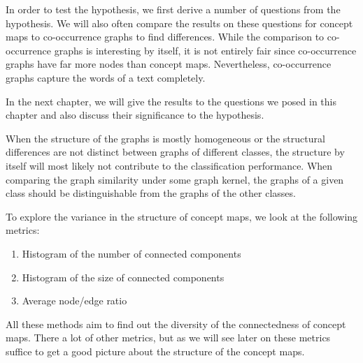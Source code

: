 
In order to test the hypothesis, we first derive a number of questions from the hypothesis.
We will also often compare the results on these questions for concept maps to co-occurrence graphs to find differences. While the comparison to co-occurrence graphs is interesting by itself, it is not entirely fair since co-occurrence graphs have far more nodes than concept maps.
Nevertheless, co-occurrence graphs capture the words of a text completely.

In the next chapter, we will give the results to the questions we posed in this chapter and also discuss their significance to the hypothesis.


When the structure of the graphs is mostly homogeneous or the structural differences are not distinct between graphs of different classes, the structure by itself will most likely not contribute to the classification performance.
When comparing the graph similarity under some graph kernel, the graphs of a given class should be distinguishable from the graphs of the other classes.

To explore the variance in the structure of concept maps, we look at the following metrics:
\begin{enumerate}
    \item{Histogram of the number of connected components}
    \item{Histogram of the size of connected components}
    \item{Average node/edge ratio}
\end{enumerate}

All these methods aim to find out the diversity of the connectedness of concept maps. There a lot of other metrics, but as we will see later on these metrics suffice to get a good picture about the structure of the concept maps.

